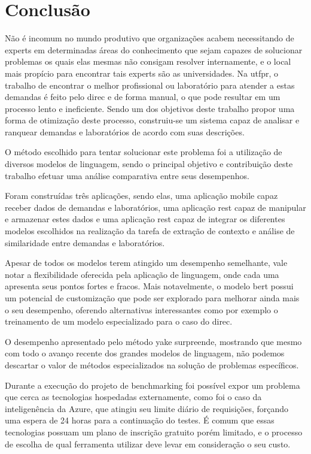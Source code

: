\chapter{Conclusão}\label{cap:conclusoes}

Não é incomum no mundo produtivo que organizações acabem necessitando de experts em determinadas áreas do conhecimento que sejam capazes de solucionar problemas os quais elas mesmas não consigam resolver internamente, e o local mais propício para encontrar tais experts são as universidades. Na \gls{utfpr}, o trabalho de encontrar o melhor profissional ou laboratório para atender a estas demandas é feito pelo \gls{direc} e de forma manual, o que pode resultar em um processo lento e ineficiente. Sendo um dos objetivos deste trabalho propor uma forma de otimização deste processo, construiu-se um sistema capaz de analisar e ranquear demandas e laboratórios de acordo com suas descrições.

O método escolhido para tentar solucionar este problema foi a utilização de diversos modelos de linguagem, sendo o principal objetivo e contribuição deste trabalho efetuar uma análise comparativa entre seus desempenhos.

Foram construídas três aplicações, sendo elas, uma aplicação mobile capaz receber dados de demandas e laboratórios, uma aplicação \gls{rest} capaz de manipular e armazenar estes dados e uma aplicação \gls{rest} capaz de integrar os diferentes modelos escolhidos na realização da tarefa de extração de contexto e análise de similaridade entre demandas e laboratórios.

Apesar de todos os modelos terem atingido um desempenho semelhante, vale notar a flexibilidade oferecida pela aplicação de linguagem, onde cada uma apresenta seus pontos fortes e fracos. Mais notavelmente, o modelo \gls{bert} possui um potencial de customização que pode ser explorado para melhorar ainda mais o seu desempenho, oferendo alternativas interessantes como por exemplo o treinamento de um modelo especializado para o caso do \gls{direc}.

O desempenho apresentado pelo método \gls{yake} surpreende, mostrando que mesmo com todo o avanço recente dos grandes modelos de linguagem, não podemos descartar o valor de métodos especializados na solução de problemas específicos.

Durante a execução do projeto de benchmarking foi possível expor um problema que cerca as tecnologias hospedadas externamente, como foi o caso da inteligenência da Azure, que atingiu seu limite diário de requisições, forçando uma espera de 24 horas para a continuação do testes. É comum que essas tecnologias possuam um plano de inscrição gratuito porém limitado, e o processo de escolha de qual ferramenta utilizar deve levar em consideração o seu custo. 

